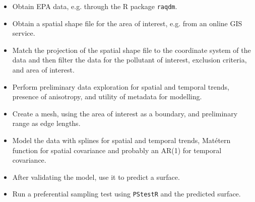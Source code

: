 \documentclass{article}
\begin{document}
\begin{itemize}
    \item Obtain \ac{EPA} data, e.g. through the R package \texttt{raqdm}.
    \item Obtain a spatial shape file for the area of interest, e.g. from an online GIS service.
    \item Match the projection of the spatial shape file to the coordinate system of the data and then filter the data for the pollutant of interest, exclusion criteria, and area of interest.
    \item Perform preliminary data exploration for spatial and temporal trends, presence of anisotropy, and utility of metadata for modelling. 
    \item Create a mesh, using the area of interest as a boundary, and preliminary range as edge lengths.
    \item Model the data with splines for spatial and temporal trends, Mat\'{e}tern function for spatial covariance and probably an AR(1) for temporal covariance.  
    \item After validating the model, use it to predict a surface.
    \item Run a preferential sampling test using \texttt{PStestR} and the predicted surface.
\end{itemize}





%
\end{document}

